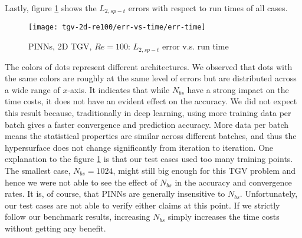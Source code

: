 Lastly, figure \ref{fig:tgv2d-re100-err-vs-time} shows the $L_{2,sp-t}$ errors with respect to run times of all cases.
\begin{figure}[hbt!]
    \centering%
    \texttt{[image: tgv-2d-re100/err-vs-time/err-time]}
    \caption[%
        PINNs, 2D TGV, $Re=100$: $L_{2,sp-t}$ error v.s. run time%
    ]{%
        PINNs, 2D TGV, $Re=100$: $L_{2,sp-t}$ error v.s. run time%
    }
    \label{fig:tgv2d-re100-err-vs-time}
\end{figure}
The colors of dots represent different architectures.
We observed that dots with the same colors are roughly at the same level of errors but are distributed across a wide range of $x$-axis.
It indicates that while $N_{bs}$ have a strong impact on the time costs, it does not have an evident effect on the accuracy.
We did not expect this result because, traditionally in deep learning, using more training data per batch gives a faster convergence and prediction accuracy.
More data per batch means the statistical properties are similar across different batches, and thus the hypersurface does not change significantly from iteration to iteration.
One explanation to the figure \ref{fig:tgv2d-re100-err-vs-time} is that our test cases used too many training points.
The smallest case, $N_{bs}=1024$, might still big enough for this TGV problem and hence we were not able to see the effect of $N_{bs}$ in the accuracy and convergence rates.
It is, of course, that PINNs are generally insensitive to $N_{bs}$. 
Unfortunately, our test cases are not able to verify either claims at this point.
If we strictly follow our benchmark results, increasing $N_{bs}$ simply increases the time costs without getting any benefit.
